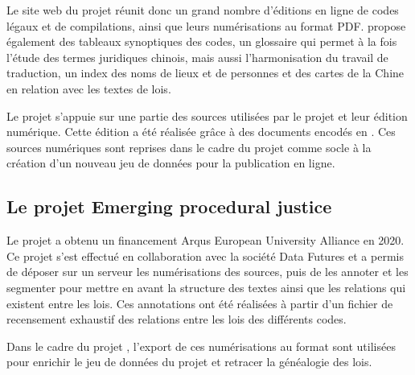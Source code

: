 Le site web du projet \LSC réunit donc un grand nombre d'éditions en ligne de codes légaux et de compilations, ainsi que leurs numérisations au format PDF. \LSC propose également des tableaux synoptiques des codes, un glossaire qui permet à la fois l'étude des termes juridiques chinois, mais aussi l'harmonisation du travail de traduction, un index des noms de lieux et de personnes et des cartes de la Chine en relation avec les textes de lois. 

Le projet \COREL s'appuie sur une partie des sources utilisées par le projet \LSC et leur édition numérique. Cette édition a été réalisée grâce à des documents encodés en \XML. Ces sources numériques sont reprises dans le cadre du projet \COREL comme socle à la création d'un nouveau jeu de données pour la publication en ligne. 

\subsection{Le projet Emerging procedural justice}
Le projet \EPJ a obtenu un financement Arqus European University Alliance en 2020. Ce projet s'est effectué en collaboration avec la société Data Futures et a permis de déposer sur un serveur \IIIF les numérisations des sources, puis de les annoter et les segmenter pour mettre en avant la structure des textes ainsi que les relations qui existent entre les lois. Ces annotations ont été réalisées à partir d'un fichier de recensement exhaustif des relations entre les lois des différents codes. 

Dans le cadre du projet \COREL, l'export de ces numérisations au format \JSON sont utilisées pour enrichir le jeu de données du projet et retracer la généalogie des lois.  